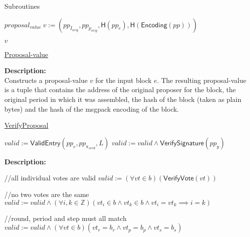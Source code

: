 \documentclass[10pt,a4paper]{article}
\begin{document}
\begin{section}{Subroutines}
\begin{algorithm}[H]
\begin{algorithmic}[1]
    \State $proposal_{value} \ v := (pp_{I_{orig}}, pp_{p_{orig}}, \mathsf{H}(pp_e), \mathsf{H}(\mathsf{Encoding}(pp)))$

    \State \Return $v$

    \EndFunction
    \end{algorithmic}
    \caption{\underline{Proposal-value}}
\end{algorithm}

\noindent \textbf{Description:}\\ Constructs a proposal-value $v$ for the input block $e$.
The resulting proposal-value is a tuple that contains the address of the original proposer for
the block, the original period in which it was assembled, the hash of the block (taken as plain bytes) 
and the hash of the msgpack encoding of the block.


\begin{algorithm}[H]
    \caption{\underline{VerifyProposal}}
    \label{algo:verify-proposal}
    \begin{algorithmic}[1]

    \State $valid := \mathsf{ValidEntry}(pp_e, pp_{\pi_{seed}}, L)$
    \State $valid := valid \land \mathsf{VerifySignature}(pp_y)$

    \EndFunction
    \end{algorithmic}
\end{algorithm}

\noindent \textbf{Description:}\\


\begin{algorithm}[H]\label{algo:verify-bundle}
    \begin{algorithmic}[1]

    //all individual votes are valid
    \State $valid := (\forall vt \in b)(\mathsf{VerifyVote}(vt))$
    
    //no two votes are the same
    \State $valid := valid \land (\forall i,k \in \mathbb{Z})(vt_i \in b \land vt_k \in b \land vt_i = vt_k \implies i=k)$

    //round, period and step must all match
    \State $valid := valid \land (\forall vt \in b)(vt_r = b_r \land vt_p = b_p \land vt_s = b_s)$
  

\end{algorithmic}
\end{algorithm}
\end{section}
\end{document}
